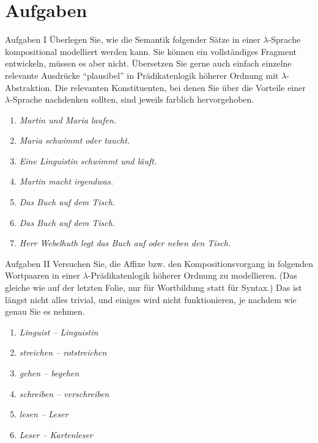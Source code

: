 \section{Aufgaben}

\begin{frame}
  {Aufgaben I}
  Überlegen Sie, wie die Semantik folgender Sätze in einer $\lambda$-Sprache kompositional modelliert werden kann. Sie können ein vollständiges Fragment entwickeln, müssen es aber nicht. Übersetzen Sie gerne auch einfach einzelne relevante Ausdrücke "`plausibel"' in Prädikatenlogik höherer Ordnung mit $\lambda$-Abstraktion. Die relevanten Konstituenten, bei denen Sie über die Vorteile einer $\lambda$-Sprache nachdenken sollten, sind jeweils farblich hervorgehoben.\\
  \Halbzeile
  \begin{enumerate}
    \item \textit{\alert{Martin und Maria} laufen.}
    \item \textit{Maria \alert{schwimmt oder taucht}.}
    \item \textit{Eine Linguistin \alert{schwimmt und läuft}.}
    \item \textit{Martin \alert{macht irgendwas}.}
    \item \textit{Das Buch  \alert{auf dem Tisch}}.
    \item \textit{Das Buch  \alert{auf dem Tisch}}.
    \item \textit{Herr Webelhuth legt das Buch \alert{auf oder neben den Tisch}.}
  \end{enumerate}
\end{frame}


\begin{frame}
  {Aufgaben II}
  Versuchen Sie, die Affixe bzw. den Kompositionsvorgang in folgenden Wortpaaren in einer $\lambda$-Prädikatenlogik höherer Ordnung zu modellieren. (Das gleiche wie auf der letzten Folie, nur für Wortbildung statt für Syntax.) Das ist längst nicht alles trivial, und einiges wird nicht funktionieren, je nachdem wie genau Sie es nehmen.\\
  \Halbzeile
  \begin{enumerate}
    \item \textit{Linguist -- Linguist\alert{in}}\\
    \item \textit{streichen -- \alert{rot}streichen}\\
    \item \textit{gehen -- \alert{be}gehen}
    \item \textit{schreiben -- \alert{ver}schreiben}
    \item \textit{lesen -- Les\alert{er}}
    \item \textit{Leser -- \alert{Karten}leser}
  \end{enumerate}
\end{frame}

